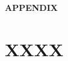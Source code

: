 \documentclass[12pt]{article}
\begin{document}
\newpage
{}
\recalctypearea

\newpage
\begin{center}
    \textbf{APPENDIX}
\end{center}

\section{XXXX}
\end{document}
